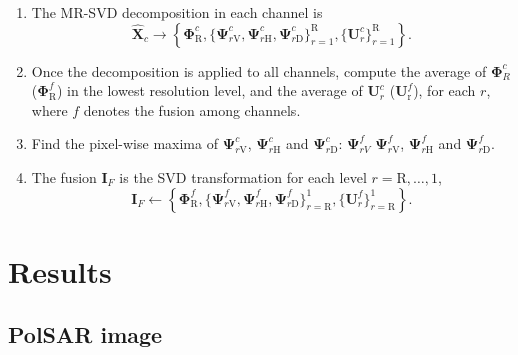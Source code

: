 \documentclass[journal]{IEEEtran}
\begin{document}
\begin{enumerate}
\item The MR-SVD decomposition in each channel is
\begin{equation}\nonumber
\widehat{\bm X}_c\rightarrow \left\{\bm \Phi_\text{R}^c,\{\bm\Psi_{r\text{V}}^c,\bm\Psi_{r\text{H}}^c,\bm\Psi_{r\text{D}}^c \}_{r=1}^\text{R},\{\bm U_r^c	\}_{r=1}^\text{R} \right\}.
\end{equation}
\item Once the decomposition is applied to all channels, 
compute the average of $\bm\Phi_R^c$ ($\bm\Phi_\text{R}^f$) in the lowest resolution level, and the average 
of $\bm U_r^c$ ($\bm U_\text{r}^f$), for each $r$, where $f$ denotes the fusion among channels. 
\item Find the pixel-wise maxima of $\bm\Psi_{r\text{V}}^c$, $\bm\Psi_{r\text{H}}^c$ and $\bm\Psi_{r\text{D}}^c$: $ \bm\Psi_{rV}^f$ $\bm\Psi_{r\text{V}}^f$, $\bm\Psi_{r\text{H}}^f$ and $\bm\Psi_{r\text{D}}^f$.
\item The fusion $\bm I_F$ is the SVD transformation for each level $r=\text{R},\dots,1$,  
\begin{equation}\nonumber
\bm I_F\leftarrow \left\{\bm \Phi_\text{R}^f,\{\bm\Psi_{r\text{V}}^f,\bm\Psi_{r\text{H}}^f,\bm\Psi_{r\text{D}}^f \}_{r=\text{R}}^1,\{\bm U_r^f\}_{r=\text{R}}^1 \right\}.
\end{equation}
\end{enumerate}

\section{Results}\label{sec_05}

\subsection{PolSAR image}
\end{document}
